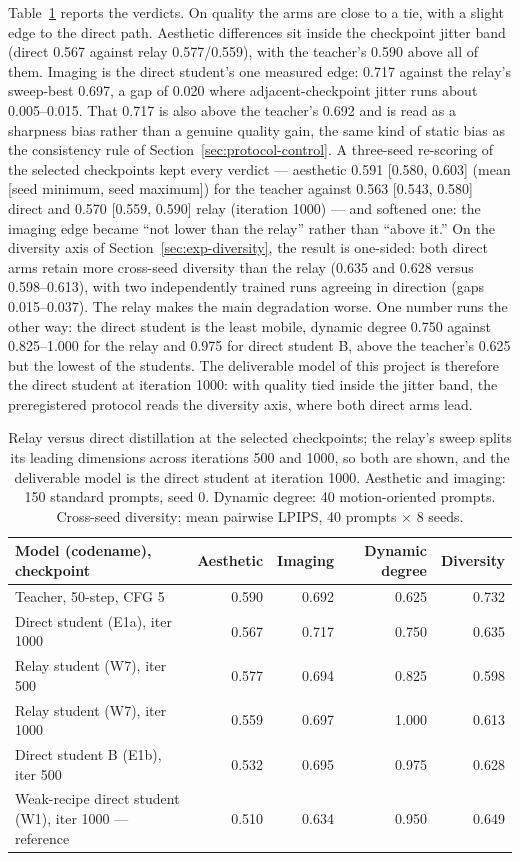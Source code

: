 \documentclass[11pt,a4paper]{article}
\begin{document}
Table~\ref{tab:g2} reports the verdicts. On quality the arms are close to a tie, with a slight edge to the direct path. Aesthetic differences sit inside the checkpoint jitter band (direct 0.567 against relay 0.577/0.559), with the teacher's 0.590 above all of them. Imaging is the direct student's one measured edge: 0.717 against the relay's sweep-best 0.697, a gap of 0.020 where adjacent-checkpoint jitter runs about 0.005–0.015. That 0.717 is also above the teacher's 0.692 and is read as a sharpness bias rather than a genuine quality gain, the same kind of static bias as the consistency rule of Section~\ref{sec:protocol-control}. A three-seed re-scoring of the selected checkpoints kept every verdict — aesthetic 0.591 [0.580, 0.603] (mean [seed minimum, seed maximum]) for the teacher against 0.563 [0.543, 0.580] direct and 0.570 [0.559, 0.590] relay (iteration 1000) — and softened one: the imaging edge became ``not lower than the relay'' rather than ``above it.'' On the diversity axis of Section~\ref{sec:exp-diversity}, the result is one-sided: both direct arms retain more cross-seed diversity than the relay (0.635 and 0.628 versus 0.598–0.613), with two independently trained runs agreeing in direction (gaps 0.015–0.037). The relay makes the main degradation worse. One number runs the other way: the direct student is the least mobile, dynamic degree 0.750 against 0.825–1.000 for the relay and 0.975 for direct student B, above the teacher's 0.625 but the lowest of the students. The deliverable model of this project is therefore the direct student at iteration 1000: with quality tied inside the jitter band, the preregistered protocol reads the diversity axis, where both direct arms lead.

\begin{table}[htbp]
  \centering
  \footnotesize
  \setlength{\tabcolsep}{4pt}
  \begin{tabular}{lrrrr}
    \toprule
    Model (codename), checkpoint & Aesthetic & Imaging & Dynamic degree & Diversity \\
    \midrule
    Teacher, 50-step, CFG 5 & 0.590 & 0.692 & 0.625 & 0.732 \\
    Direct student (E1a), iter 1000 & 0.567 & 0.717 & 0.750 & 0.635 \\
    Relay student (W7), iter 500 & 0.577 & 0.694 & 0.825 & 0.598 \\
    Relay student (W7), iter 1000 & 0.559 & 0.697 & 1.000 & 0.613 \\
    Direct student B (E1b), iter 500 & 0.532 & 0.695 & 0.975 & 0.628 \\
    Weak-recipe direct student (W1), iter 1000 — reference & 0.510 & 0.634 & 0.950 & 0.649 \\
    \bottomrule
  \end{tabular}
  \caption{Relay versus direct distillation at the selected checkpoints; the relay's sweep splits its leading dimensions across iterations 500 and 1000, so both are shown, and the deliverable model is the direct student at iteration 1000. Aesthetic and imaging: 150 standard prompts, seed 0. Dynamic degree: 40 motion-oriented prompts. Cross-seed diversity: mean pairwise LPIPS, 40 prompts $\times$ 8 seeds.}
  \label{tab:g2}
\end{table}
\end{document}
